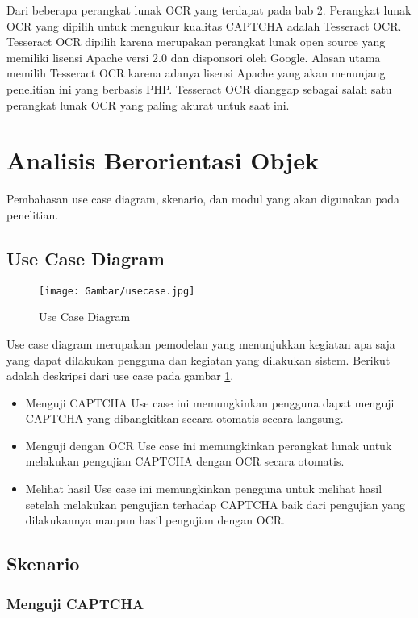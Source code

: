 Dari beberapa perangkat lunak OCR yang terdapat pada bab 2. Perangkat lunak OCR yang dipilih untuk mengukur kualitas CAPTCHA adalah Tesseract OCR. Tesseract OCR dipilih karena merupakan perangkat lunak open source yang memiliki lisensi Apache versi 2.0 dan disponsori oleh Google. Alasan utama memilih Tesseract OCR karena adanya lisensi Apache yang akan menunjang penelitian ini yang berbasis PHP. Tesseract OCR dianggap sebagai salah satu perangkat lunak OCR yang paling akurat untuk saat ini.

\section{Analisis Berorientasi Objek}
\label{sec:analisisberorientasiobjek}

Pembahasan use case diagram, skenario, dan modul yang akan digunakan pada penelitian.

\subsection{Use Case Diagram}
\begin{figure}[H]
\centering
\texttt{[image: Gambar/usecase.jpg]}
\caption[Use Case Diagram]{Use Case Diagram} 
\label{fig:usecase}
\end{figure}

Use case diagram merupakan pemodelan yang menunjukkan kegiatan apa saja yang dapat dilakukan pengguna dan kegiatan yang dilakukan sistem. Berikut adalah deskripsi dari use case pada gambar \ref{fig:usecase}.

\begin{itemize}
\item Menguji CAPTCHA
Use case ini memungkinkan pengguna dapat menguji CAPTCHA yang dibangkitkan secara otomatis secara langsung.
\item Menguji dengan OCR
Use case ini memungkinkan perangkat lunak untuk melakukan pengujian CAPTCHA dengan OCR secara otomatis.
\item Melihat hasil
Use case ini memungkinkan pengguna untuk melihat hasil setelah melakukan pengujian terhadap CAPTCHA baik dari pengujian yang dilakukannya maupun hasil pengujian dengan OCR.
\end{itemize}

\subsection{Skenario}
\subsubsection{Menguji CAPTCHA}

